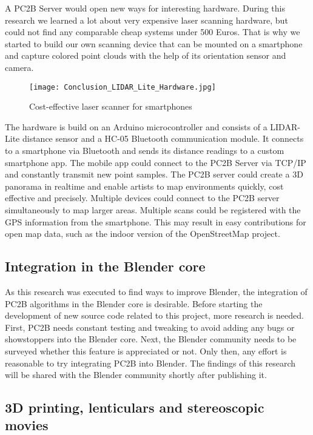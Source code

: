 A PC2B Server would open new ways for interesting hardware. During this research we learned a lot about very expensive laser scanning hardware, but could not find any comparable cheap systems under 500 Euros. That is why we started to build our own scanning device that can be mounted on a smartphone and capture colored point clouds with the help of its orientation sensor and camera.

\begin{figure}[h]
	\centering
	\texttt{[image: Conclusion\_LIDAR\_Lite\_Hardware.jpg]}
	\caption{Cost-effective laser scanner for smartphones}
	\label{fig:conclusion_lidar_lite_hardware}
\end{figure}

The hardware is build on an Arduino microcontroller and consists of a LIDAR-Lite distance sensor and a HC-05 Bluetooth communication module. It connects to a smartphone via Bluetooth and sends its distance readings to a custom smartphone app. The mobile app could connect to the PC2B Server via TCP/IP and constantly transmit new point samples. The PC2B server could create a 3D panorama in realtime and enable artists to map environments quickly, cost effective and precisely. Multiple devices could connect to the PC2B server simultaneously to map larger areas. Multiple scans could be registered with the GPS information from the smartphone. This may result in easy contributions for open map data, such as the indoor version of the OpenStreetMap project.

\subsection{Integration in the Blender core}

As this research was executed to find ways to improve Blender, the integration of PC2B algorithms in the Blender core is desirable. Before starting the development of new source code related to this project, more research is needed. First, PC2B needs constant testing and tweaking to avoid adding any bugs or showstoppers into the Blender core. Next, the Blender community needs to be surveyed whether this feature is appreciated or not. Only then, any effort is reasonable to try integrating PC2B into Blender. The findings of this research will be shared with the Blender community shortly after publishing it.

\subsection{3D printing, lenticulars and stereoscopic movies}

